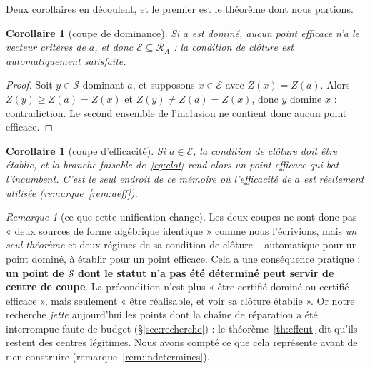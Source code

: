 \documentclass[11pt,a4paper]{article}
\theoremstyle{plain}
\newtheorem{corollary}[theorem]{Corollaire}
\theoremstyle{remark}
\newtheorem{remark}{Remarque}
\newcommand{\Ecal}{\mathcal{E}}
\newcommand{\Scal}{\mathcal{S}}
\newcommand{\Rcal}{\mathcal{R}}
\begin{document}
\noindent
Deux corollaires en découlent, et le premier est le théorème dont nous
partions.

\begin{corollary}[coupe de dominance]\label{cor:dom}
Si $a$ est \emph{dominé}, aucun point efficace n'a le vecteur critères de
$a$, et donc $\Ecal\subseteq\Rcal_A$ : la condition de clôture est
automatiquement satisfaite.
\end{corollary}

\begin{proof}
Soit $y\in\Scal$ dominant $a$, et supposons $x\in\Ecal$ avec $Z(x)=Z(a)$.
Alors $Z(y)\ge Z(a)=Z(x)$ et $Z(y)\ne Z(a)=Z(x)$, donc $y$ domine $x$ :
contradiction. Le second ensemble de l'inclusion ne contient donc aucun
point efficace. \end{proof}

\begin{corollary}[coupe d'efficacité]\label{cor:eff}
Si $a\in\Ecal$, la condition de clôture doit être établie, et la branche
faisable de~\eqref{eq:clot} rend alors un point \emph{efficace} qui bat
l'incumbent. C'est le seul endroit de ce mémoire où l'efficacité de $a$ est
réellement utilisée (remarque~\ref{rem:aeff}).
\end{corollary}

\begin{remark}[ce que cette unification change]
Les deux coupes ne sont donc pas « deux sources de forme algébrique
identique » comme nous l'écrivions, mais \emph{un seul théorème} et deux
régimes de sa condition de clôture -- automatique pour un point dominé, à
établir pour un point efficace. Cela a une conséquence pratique :
\textbf{un point de $\Scal$ dont le statut n'a pas été déterminé peut servir
de centre de coupe}. La précondition n'est plus « être certifié dominé ou
certifié efficace », mais seulement « être réalisable, et voir sa clôture
établie ». Or notre recherche \emph{jette} aujourd'hui les points dont la
chaîne de réparation a été interrompue faute de budget
(§\ref{sec:recherche}) : le théorème~\ref{th:effcut} dit qu'ils restent des
centres légitimes. Nous avons compté ce que cela représente avant de rien
construire (remarque~\ref{rem:indetermines}).
\end{remark}
\end{document}
